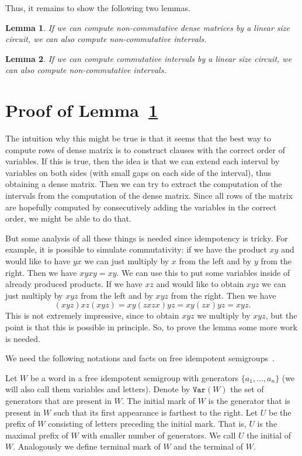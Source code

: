 \documentclass[11pt,letterpaper]{article}
\newtheorem{lemma}{Lemma}
\newcommand{\var}{\texttt{Var}}
\begin{document}
Thus, it remains to show the following two lemmas.

\begin{lemma} \label{lem:dense_matrices}
If we can compute non-commutative dense matrices by a linear size circuit, we can also compute non-commutative intervals. 
\end{lemma}

\begin{lemma} \label{lem:intervals}
If we can compute commutative intervals by a linear size circuit, we can also compute non-commutative intervals. 
\end{lemma}

\section{Proof of Lemma~\ref{lem:dense_matrices}}

The intuition why this might be true is that it seems that the best way to compute rows of dense matrix is to construct clauses with the correct order of variables. If this is true, then the idea is that we can extend each interval by variables on both sides (with small gaps on each side of the interval), thus obtaining a dense matrix. Then we can try to extract the computation of the intervals from the computation of the dense matrix. Since all rows of the matrix are hopefully computed by consecutively adding the variables in the correct order, we might be able to do that.

But some analysis of all these things is needed since idempotency is tricky. For example, it is possible to simulate commutativity: if we have the product $xy$ and would like to have $yx$ we can just multiply by $x$ from the left and by $y$ from the right. Then we have $xyxy=xy$. We can use this to put some variables inside of already produced products. If we have $xz$ and would like to obtain $xyz$ we can just multiply by $xyz$ from the left and by $xyz$ from the right. Then we have
$$
(xyz)xz(xyz)=xy(zxzx)yz=xy(zx)yz=xyz.
$$ 
This is not extremely impressive, since to obtain $xyz$ we multiply by $xyz$, but the point is that this is possible in principle. So, to prove the lemma some more work is needed.

We need the following notations and facts on free idempotent semigroups~\cite{GreenR52}.

Let $W$ be a word in a free idempotent semigroup with generators $\{a_1,\ldots, a_n\}$ (we will also call them variables and letters). Denote by $\var(W)$ the set of generators that are present in $W$. The initial mark of $W$ is the generator that is present in $W$ such that its first appearance is farthest to the right. Let $U$ be the prefix of $W$ consisting of letters preceding the initial mark. That is, $U$ is the maximal prefix of $W$ with smaller number of generators. We call $U$ the initial of $W$. Analogously we define terminal mark of $W$ and the terminal of $W$.
\end{document}

